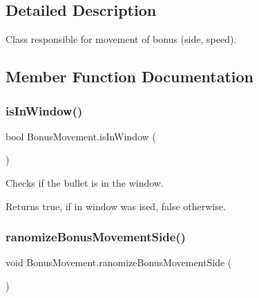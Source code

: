 \subsection{Detailed Description}
Class responsible for movement of bonus (side, speed). 



\subsection{Member Function Documentation}
\mbox{\label{class_bonus_movement_ad4a51d66472b7d98a7813fca3c2cb626}} 
\subsubsection{\texorpdfstring{is\+In\+Window()}{isInWindow()}}
{\footnotesize\ttfamily bool Bonus\+Movement.\+is\+In\+Window (\begin{DoxyParamCaption}{ }\end{DoxyParamCaption})\hspace{0.3cm}{\ttfamily [private]}}



Checks if the bullet is in the window. 

\begin{DoxyReturn}{Returns}
{\ttfamily true}, if in window was ised, {\ttfamily false} otherwise.
\end{DoxyReturn}
\mbox{\label{class_bonus_movement_adf840dc4aa70ab5a73860849f1299785}} 
\subsubsection{\texorpdfstring{ranomize\+Bonus\+Movement\+Side()}{ranomizeBonusMovementSide()}}
{\footnotesize\ttfamily void Bonus\+Movement.\+ranomize\+Bonus\+Movement\+Side (\begin{DoxyParamCaption}{ }\end{DoxyParamCaption})\hspace{0.3cm}{\ttfamily [private]}}



